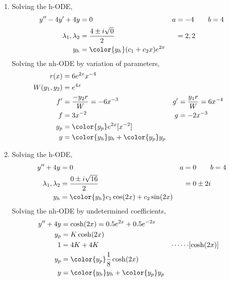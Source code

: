 \begin{enumerate}
    \item Solving the h-ODE,
          \begin{align}
              y'' - 4y' + 4y           & = 0                                    &
              a                        & = -4 \qquad b = 4                        \\
              \lambda_{1}, \lambda_{2} & = \frac{4 \pm i\sqrt{0}}{2}            &
                                       & = 2, 2                                   \\
              y_{h}                    & = {\color{y_h} (c_{1} + c_{2}x)e^{2x}}
          \end{align}
          Solving the nh-ODE by variation of parameters,
          \begin{align}
              r(x)            & = 6e^{2x}x^{-4}                               \\
              W(y_{1}, y_{2}) & = e^{4x}                                      \\
              f'              & = \frac{-y_{2}r}{W} = -6x^{-3}              &
              g'              & = \frac{y_{1}r}{W} = 6x^{-4}                  \\
              f               & = 3x^{-2}                                   &
              g               & = -2x^{-3}                                    \\
              y_{p}           & = {\color{y_p} e^{2x}[x^{-2}]}                \\
              y               & = {\color{y_h} y_{h}} + {\color{y_p} y_{p}}
          \end{align}

    \item Solving the h-ODE,
          \begin{align}
              y'' + 4y                 & = 0                          &
              a                        & = 0 \qquad b = 4               \\
              \lambda_{1}, \lambda_{2} & = \frac{0 \pm i\sqrt{16}}{2} &
                                       & = 0 \pm 2i                     \\
              y_{h}                    & = {\color{y_h} c_{1}\cos(2x)
              + c_{2}\sin(2x)}
          \end{align}
          Solving the nh-ODE by undetermined coefficients,
          \begin{align}
              y'' + 4y     & = \cosh(2x) = 0.5e^{2x} + 0.5e^{-2x}          \\
              y_{p}        & = K\cosh(2x)                                  \\
              1            & =  4K + 4K                                  &
              \cdots\cdots & [\cosh(2x)]                                   \\
              y_{p}        & = {\color{y_p} \frac{1}{8}\cosh(2x)}          \\
              y            & = {\color{y_h} y_{h}} + {\color{y_p} y_{p}}
          \end{align}


\end{enumerate}
